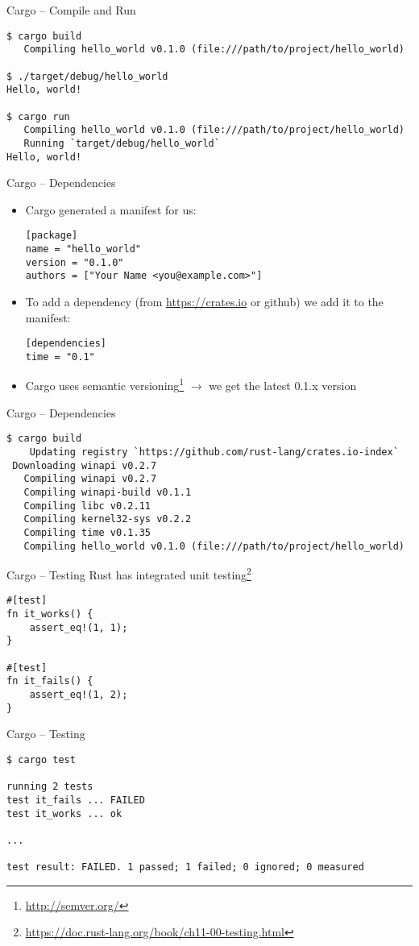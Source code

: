 \begin{frame}[fragile]{Cargo -- Compile and Run}
\begin{verbatim}
$ cargo build
   Compiling hello_world v0.1.0 (file:///path/to/project/hello_world)

$ ./target/debug/hello_world
Hello, world!

$ cargo run
   Compiling hello_world v0.1.0 (file:///path/to/project/hello_world)
   Running `target/debug/hello_world`
Hello, world!
\end{verbatim}
\end{frame}

\begin{frame}[fragile]{Cargo -- Dependencies}
\begin{itemize}
    \item Cargo generated a manifest for us:
\begin{verbatim}
[package]
name = "hello_world"
version = "0.1.0"
authors = ["Your Name <you@example.com>"]
\end{verbatim}
    \item To add a dependency (from \url{https://crates.io} or github) we add it to the manifest:
\begin{verbatim}
[dependencies]
time = "0.1"
\end{verbatim}
    \item Cargo uses semantic versioning\footnote{\url{http://semver.org/}}
    $\rightarrow$ we get the latest 0.1.x version
\end{itemize}
\end{frame}

\begin{frame}[fragile]{Cargo -- Dependencies}
\begin{verbatim}
$ cargo build
    Updating registry `https://github.com/rust-lang/crates.io-index`
 Downloading winapi v0.2.7
   Compiling winapi v0.2.7
   Compiling winapi-build v0.1.1
   Compiling libc v0.2.11
   Compiling kernel32-sys v0.2.2
   Compiling time v0.1.35
   Compiling hello_world v0.1.0 (file:///path/to/project/hello_world)
\end{verbatim}
\end{frame}

\begin{frame}[fragile,c]{Cargo -- Testing}
	Rust has integrated unit testing\footnote{\url{https://doc.rust-lang.org/book/ch11-00-testing.html}}

\begin{verbatim}
#[test]
fn it_works() {
    assert_eq!(1, 1);
}

#[test]
fn it_fails() {
    assert_eq!(1, 2);
}
\end{verbatim}
\end{frame}

\begin{frame}[fragile,c]{Cargo -- Testing}
\begin{verbatim}
$ cargo test

running 2 tests
test it_fails ... FAILED
test it_works ... ok

...

test result: FAILED. 1 passed; 1 failed; 0 ignored; 0 measured
\end{verbatim}
\end{frame}

